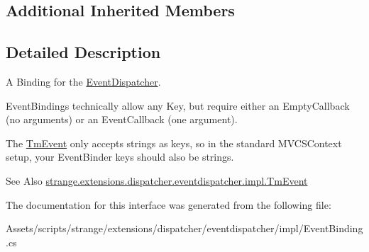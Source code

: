 \subsection*{Additional Inherited Members}


\subsection{Detailed Description}
A Binding for the \hyperlink{classstrange_1_1extensions_1_1dispatcher_1_1eventdispatcher_1_1impl_1_1_event_dispatcher}{Event\-Dispatcher}. 

Event\-Bindings technically allow any Key, but require either an Empty\-Callback (no arguments) or an Event\-Callback (one argument).

The \hyperlink{classstrange_1_1extensions_1_1dispatcher_1_1eventdispatcher_1_1impl_1_1_tm_event}{Tm\-Event} only accepts strings as keys, so in the standard M\-V\-C\-S\-Context setup, your Event\-Binder keys should also be strings.

\begin{DoxySeeAlso}{See Also}
\hyperlink{classstrange_1_1extensions_1_1dispatcher_1_1eventdispatcher_1_1impl_1_1_tm_event}{strange.\-extensions.\-dispatcher.\-eventdispatcher.\-impl.\-Tm\-Event} 
\end{DoxySeeAlso}


The documentation for this interface was generated from the following file\-:\begin{DoxyCompactItemize}
\item 
Assets/scripts/strange/extensions/dispatcher/eventdispatcher/impl/Event\-Binding.\-cs\end{DoxyCompactItemize}
